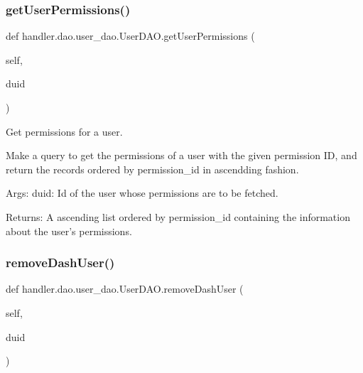 \subsubsection{\texorpdfstring{get\+User\+Permissions()}{getUserPermissions()}}
{\footnotesize\ttfamily def handler.\+dao.\+user\+\_\+dao.\+User\+D\+A\+O.\+get\+User\+Permissions (\begin{DoxyParamCaption}\item[{}]{self,  }\item[{}]{duid }\end{DoxyParamCaption})}

\begin{DoxyVerb}Get permissions for a user.

Make a query to get the permissions of a user with the given permission ID,
and return the records ordered by permission_id in ascendding fashion.

Args:
    duid: Id of the user whose permissions are to be fetched.

Returns:
    A ascending list ordered by permission_id containing the information
    about the user's permissions.
\end{DoxyVerb}
 \mbox{\label{classhandler_1_1dao_1_1user__dao_1_1_user_d_a_o_a511ca5cdef0bc6e549c11e5f51dd831c}} 
\subsubsection{\texorpdfstring{remove\+Dash\+User()}{removeDashUser()}}
{\footnotesize\ttfamily def handler.\+dao.\+user\+\_\+dao.\+User\+D\+A\+O.\+remove\+Dash\+User (\begin{DoxyParamCaption}\item[{}]{self,  }\item[{}]{duid }\end{DoxyParamCaption})}

